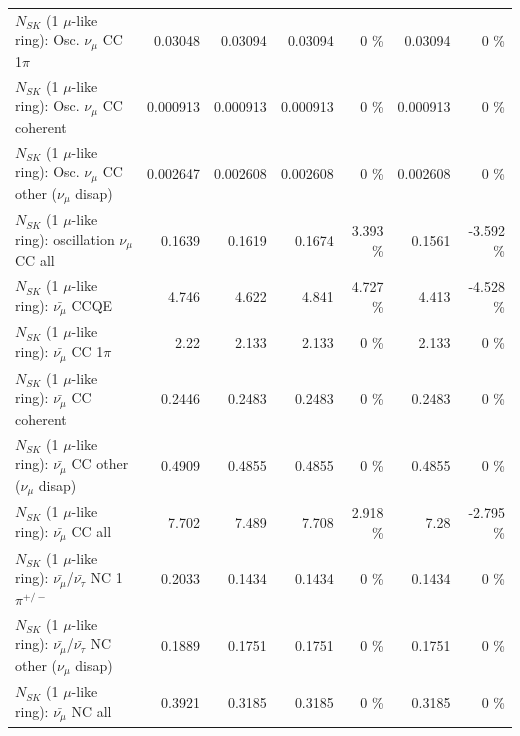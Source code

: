 \begin{table}
\begin{tabular}{| l | r | r | r  r | r  r |}
                          $N_{SK}$ (1 $\mu$-like ring): Osc. $\nu_\mu$ CC 1$\pi$ &         0.03048 &         0.03094 &         0.03094 &        0 \%  &         0.03094 &        0 \%  \\ 
                        $N_{SK}$ (1 $\mu$-like ring): Osc. $\nu_\mu$ CC coherent &        0.000913 &        0.000913 &        0.000913 &        0 \%  &        0.000913 &        0 \%  \\ 
         $N_{SK}$ (1 $\mu$-like ring): Osc. $\nu_\mu$ CC other ($\nu_\mu$ disap) &        0.002647 &        0.002608 &        0.002608 &        0 \%  &        0.002608 &        0 \%  \\ 
                      $N_{SK}$ (1 $\mu$-like ring): oscillation $\nu_\mu$ CC all &          0.1639 &          0.1619 &          0.1674 &    3.393 \%  &          0.1561 &   -3.592 \%  \\ 
\hline
\hline
                              $N_{SK}$ (1 $\mu$-like ring): $\bar{\nu_\mu}$ CCQE &           4.746 &           4.622 &           4.841 &    4.727 \%  &           4.413 &   -4.528 \%  \\ 
                         $N_{SK}$ (1 $\mu$-like ring): $\bar{\nu_\mu}$ CC 1$\pi$ &            2.22 &           2.133 &           2.133 &        0 \%  &           2.133 &        0 \%  \\ 
                       $N_{SK}$ (1 $\mu$-like ring): $\bar{\nu_\mu}$ CC coherent &          0.2446 &          0.2483 &          0.2483 &        0 \%  &          0.2483 &        0 \%  \\ 
        $N_{SK}$ (1 $\mu$-like ring): $\bar{\nu_\mu}$ CC other ($\nu_\mu$ disap) &          0.4909 &          0.4855 &          0.4855 &        0 \%  &          0.4855 &        0 \%  \\ 
                          $N_{SK}$ (1 $\mu$-like ring): $\bar{\nu_{\mu}}$ CC all &           7.702 &           7.489 &           7.708 &    2.918 \%  &            7.28 &   -2.795 \%  \\ 
\hline
  $N_{SK}$ (1 $\mu$-like ring): $\bar{\nu_\mu}$/$\bar{\nu_\tau}$ NC 1$\pi^{+/-}$ &          0.2033 &          0.1434 &          0.1434 &        0 \%  &          0.1434 &        0 \%  \\ 
$N_{SK}$ (1 $\mu$-like ring): $\bar{\nu_\mu}$/$\bar{\nu_\tau}$ NC other ($\nu_\mu$ disap) &          0.1889 &          0.1751 &          0.1751 &        0 \%  &          0.1751 &        0 \%  \\ 
                          $N_{SK}$ (1 $\mu$-like ring): $\bar{\nu_{\mu}}$ NC all &          0.3921 &          0.3185 &          0.3185 &        0 \%  &          0.3185 &        0 \%  \\ 

\end{tabular}
\end{table}

